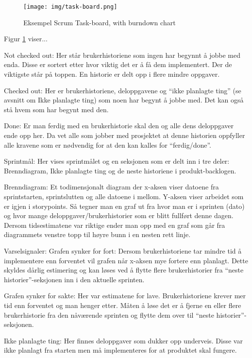 \documentclass[12pt,a4paper,norsk]{article}
\begin{document}
    \begin{figure}[h!]
 		\texttt{[image: img/task-board.png]}
  		\caption{Eksempel Scrum Task-board, with burndown chart}
  		\label{fig:task-board}
	\end{figure}
	Figur \ref{fig:task-board} viser...
    
    Not checked out: Her står brukerhistoriene som ingen har begynnt å jobbe med enda. Disse er sortert etter hvor viktig det er å få dem implementert. Der de viktigste står på toppen. En historie er delt opp i flere mindre oppgaver.

    Checked out: Her er brukerhistoriene, deloppgavene og “ikke planlagte ting” (se avsnitt om Ikke planlagte ting) som noen har begynt å jobbe med. Det kan også stå hvem som har begynt med den.

    Done: Er man ferdig med en brukerhistorie skal den og alle dens deloppgaver ende opp her. Da vet alle som jobber med prosjektet at denne historien oppfyller alle kravene som er nødvendig for at den kan kalles for “ferdig/done”.
	
    Sprintmål: Her vises sprintmålet og en seksjonen som er delt inn i tre deler: Brenndiagram, Ikke planlagte ting og de neste historiene i produkt-backlogen.

    Brenndiagram:
    Et todimensjonalt diagram der x-aksen viser datoene fra sprintstarten, sprintslutten og alle datoene i mellom. Y-aksen viser arbeidet som er igjen i storypoints. Så tegner man en graf ut fra hvor man er i sprinten (dato) og hvor mange deloppgaver/brukerhistorier som er blitt fullført denne dagen. Dersom tidsestimatene var riktige ender man opp med en graf som går fra diagrammets venstre topp til høyre bunn i en nesten rett linje.

    Varselsignaler:
	Grafen synker for fort:
    Dersom brukerhistoriene tar mindre tid å implementere enn forventet vil grafen når x-aksen mye fortere enn planlagt. Dette skyldes dårlig estimering og kan løses ved å flytte flere brukerhistorier fra “neste historier”-seksjonen inn i den aktuelle sprinten.

	Grafen synker for sakte:
    Her var estimatene for lave. Brukerhistoriene krever mer tid enn forventet og man henger etter. Måten å løse det er å fjerne en eller flere brukerhistorie fra den nåværende sprinten og flytte dem over til “neste historier”-seksjonen.

    Ikke planlagte ting:
    Her finnes deloppgaver som dukker opp underveis. Disse var ikke planlagt fra starten men må implementeres for at produktet skal fungere.
\end{document}
